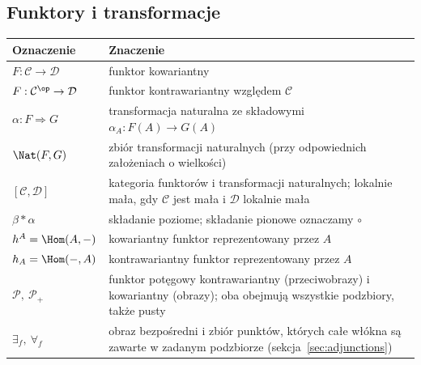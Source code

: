 \subsection{Funktory i transformacje}
\begin{center}
\renewcommand{\arraystretch}{1.15}
\begin{tabular}{@{}p{.34\linewidth}p{.60\linewidth}@{}}
\textbf{Oznaczenie} & \textbf{Znaczenie} \\
\hline
$F:\mathcal C\to\mathcal D$ & funktor kowariantny \\
$F:\mathcal C^{\op}\to\mathcal D$ & funktor kontrawariantny względem $\mathcal C$ \\
$\alpha:F\Rightarrow G$ & transformacja naturalna ze składowymi $\alpha_A:F(A)\to G(A)$ \\
$\Nat(F,G)$ & zbiór transformacji naturalnych (przy odpowiednich założeniach o wielkości) \\
$[\mathcal C,\mathcal D]$ & kategoria funktorów i transformacji naturalnych; lokalnie mała, gdy $\mathcal C$ jest mała i $\mathcal D$ lokalnie mała \\
$\beta\ast\alpha$ & składanie poziome; składanie pionowe oznaczamy $\circ$ \\
$h^A=\Hom(A,-)$ & kowariantny funktor reprezentowany przez $A$ \\
$h_A=\Hom(-,A)$ & kontrawariantny funktor reprezentowany przez $A$ \\
$\mathcal P,\ \mathcal P_+$ & funktor potęgowy kontrawariantny (przeciwobrazy) i kowariantny (obrazy); oba obejmują wszystkie podzbiory, także pusty \\
$\exists_f,\ \forall_f$ & obraz bezpośredni i zbiór punktów, których całe włókna są zawarte w zadanym podzbiorze (sekcja~\ref{sec:adjunctions}) \\
\end{tabular}
\end{center}

